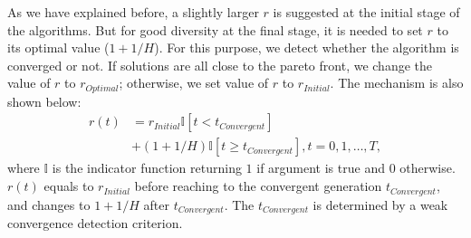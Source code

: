 \documentclass[conference]{IEEEtran}
\begin{document}
As we have explained before, 
a slightly larger $r$ is suggested at the initial stage of the algorithms. 
But for good diversity at the final stage,
it is needed to set $r$ to its optimal value ($1+1/H$). 
For this purpose, we detect whether the algorithm is converged or not.  
If solutions are all close to the pareto front, 
we change the value of $r$ to $r_{Optimal}$; otherwise, we set value of $r$ to 
$r_{Initial}$. The mechanism is also shown below:
\begin{equation}\begin{aligned}\label{endm1}
  r(t)&=r_{Initial}\mathbb{I}\left[t<t_{Convergent}\right]\\
  &+(1+1/H)\mathbb{I}\left[t \ge t_{Convergent}\right], t=0,1,\dots,T,
\end{aligned}
\end{equation}
where $\mathbb{I}$ is the indicator function returning $1$ if argument is true and $0$ otherwise.
$r(t)$ equals to $r_{Initial}$ before reaching to the convergent generation $t_{Convergent}$,
and changes to $1+1/H$ after $t_{Convergent}$. 
The $t_{Convergent}$ is determined by a weak convergence detection criterion. 

%
%
%
\end{document}
